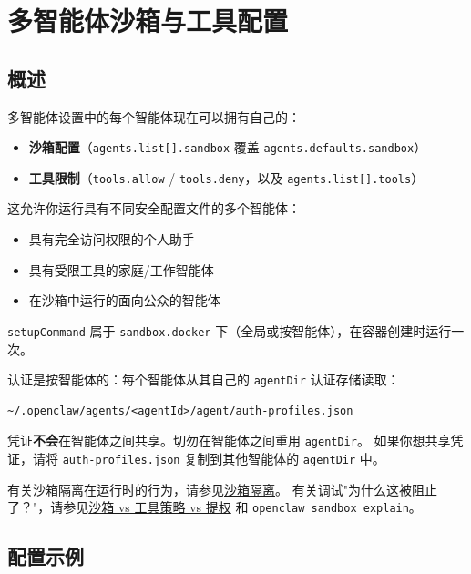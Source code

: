 \section{多智能体沙箱与工具配置}


\subsection{概述}


多智能体设置中的每个智能体现在可以拥有自己的：

\begin{itemize}
  \item \textbf{沙箱配置}（\texttt{agents.list[].sandbox} 覆盖 \texttt{agents.defaults.sandbox}）
  \item \textbf{工具限制}（\texttt{tools.allow} / \texttt{tools.deny}，以及 \texttt{agents.list[].tools}）
\end{itemize}


这允许你运行具有不同安全配置文件的多个智能体：

\begin{itemize}
  \item 具有完全访问权限的个人助手
  \item 具有受限工具的家庭/工作智能体
  \item 在沙箱中运行的面向公众的智能体
\end{itemize}


\texttt{setupCommand} 属于 \texttt{sandbox.docker} 下（全局或按智能体），在容器创建时运行一次。

认证是按智能体的：每个智能体从其自己的 \texttt{agentDir} 认证存储读取：

\begin{lstlisting}
~/.openclaw/agents/<agentId>/agent/auth-profiles.json
\end{lstlisting}


凭证\textbf{不会}在智能体之间共享。切勿在智能体之间重用 \texttt{agentDir}。
如果你想共享凭证，请将 \texttt{auth-profiles.json} 复制到其他智能体的 \texttt{agentDir} 中。

有关沙箱隔离在运行时的行为，请参见\href{/gateway/sandboxing}{沙箱隔离}。
有关调试"为什么这被阻止了？"，请参见\href{/gateway/sandbox-vs-tool-policy-vs-elevated}{沙箱 vs 工具策略 vs 提权} 和 \texttt{openclaw sandbox explain}。

\hrulefill


\subsection{配置示例}


